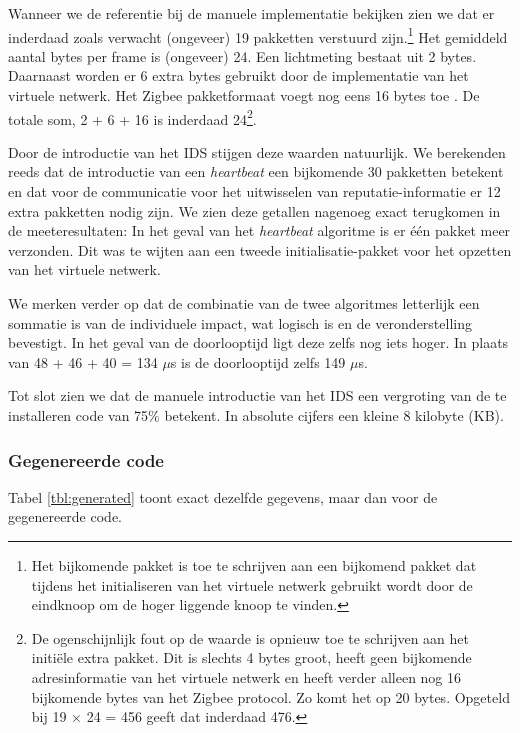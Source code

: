 Wanneer we de referentie bij de manuele implementatie bekijken zien we dat er
inderdaad zoals verwacht (ongeveer) 19 pakketten verstuurd zijn.\footnote{Het
bijkomende pakket is toe te schrijven aan een bijkomend pakket dat tijdens het
initialiseren van het virtuele netwerk gebruikt wordt door de eindknoop om de
hoger liggende knoop te vinden.} Het gemiddeld aantal bytes per frame is
(ongeveer) 24. Een lichtmeting bestaat uit 2 bytes. Daarnaast worden er 6 extra
bytes gebruikt door de implementatie van het virtuele netwerk. Het Zigbee
pakketformaat voegt nog eens 16 bytes toe \citep{alliance2012zigbee}. De totale
som, 2 + 6 + 16 is inderdaad 24\footnote{De ogenschijnlijk fout op de waarde is
opnieuw toe te schrijven aan het initi\"ele extra pakket. Dit is slechts 4
bytes groot, heeft geen bijkomende adresinformatie van het virtuele netwerk en
heeft verder alleen nog 16 bijkomende bytes van het Zigbee protocol. Zo komt
het op 20 bytes. Opgeteld bij 19 $\times$ 24 = 456 geeft dat inderdaad 476.}.

Door de introductie van het IDS stijgen deze waarden natuurlijk. We berekenden
reeds dat de introductie van een \emph{heartbeat} een bijkomende 30 pakketten
betekent en dat voor de communicatie voor het uitwisselen van
reputatie-informatie er 12 extra pakketten nodig zijn. We zien deze getallen
nagenoeg exact terugkomen in de meeteresultaten: In het geval van het
\emph{heartbeat} algoritme is er \'e\'en pakket meer verzonden. Dit was te
wijten aan een tweede initialisatie-pakket voor het opzetten van het virtuele
netwerk.

We merken verder op dat de combinatie van de twee algoritmes letterlijk een
sommatie is van de individuele impact, wat logisch is en de veronderstelling
bevestigt. In het geval van de doorlooptijd ligt deze zelfs nog iets hoger. In
plaats van 48 + 46 + 40 = 134 $\mu$s is de doorlooptijd zelfs 149 $\mu$s.

Tot slot zien we dat de manuele introductie van het IDS een vergroting van de
te installeren code van 75\% betekent. In absolute cijfers een kleine 8
kilobyte (KB).

\subsubsection{Gegenereerde code}

Tabel \ref{tbl:generated} toont exact dezelfde gegevens, maar dan voor de
gegenereerde code.

